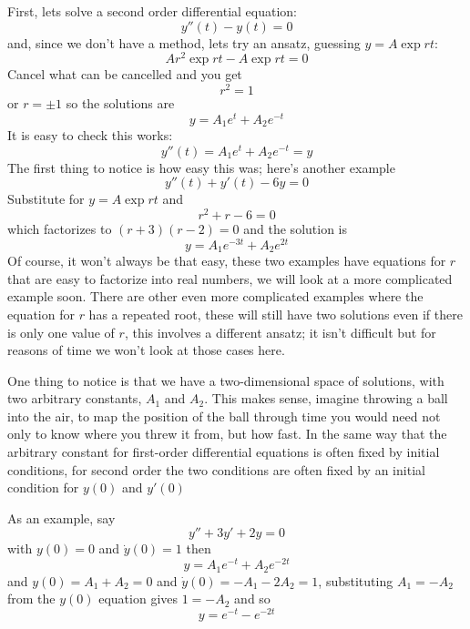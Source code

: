 \documentclass[12pt]{article}
\begin{document}
First, lets solve a second order differential equation:
\begin{equation}
  y''(t)-y(t)=0
\end{equation}
and, since we don't have a method, lets try an ansatz, guessing $y=A\exp{rt}$:
\begin{equation}
  Ar^2\exp{rt}-A\exp{rt}=0
\end{equation}
Cancel what can be cancelled and you get
\begin{equation}
  r^2=1
\end{equation}
or $r=\pm 1$ so the solutions are
\begin{equation}
  y=A_1e^t+A_2e^{-t}
\end{equation}
It is easy to check this works:
\begin{equation}
  y''(t)=A_1e^{t}+A_2e^{-t}=y
\end{equation}
The first thing to notice is how easy this was; here's another example
\begin{equation}
  y''(t)+y'(t)-6y=0
\end{equation}
Substitute for $y=A\exp{rt}$ and
\begin{equation}
  r^2+r-6=0
\end{equation}
which factorizes to $(r+3)(r-2)=0$ and the solution is
\begin{equation}
  y=A_1e^{-3t}+A_2e^{2t}
\end{equation}
Of course, it won't always be that easy, these two examples have
equations for $r$ that are easy to factorize into real numbers, we
will look at a more complicated example soon. There are other even
more complicated examples where the equation for $r$ has a repeated
root, these will still have two solutions even if there is only one
value of $r$, this involves a different ansatz; it isn't difficult but
for reasons of time we won't look at those cases here.

One thing to notice is that we have a two-dimensional space of solutions, with two
arbitrary constants, $A_1$ and $A_2$. This makes sense, imagine
throwing a ball into the air, to map the position of the ball through
time you would need not only to know where you threw it from, but how
fast. In the same way that the arbitrary constant for first-order
differential equations is often fixed by initial conditions, for
second order the two conditions are often fixed by an initial condition
for $y(0)$ and $y'(0)$

As an example, say
\begin{equation}
  y''+3y'+2y=0
\end{equation}
with $y(0)=0$ and $\dot{y}(0)=1$ then
\begin{equation}
  y=A_1e^{-t}+A_2e^{-2t}
\end{equation}
and $y(0)=A_1+A_2=0$ and $\dot{y}(0)=-A_1-2A_2=1$, substituting
$A_1=-A_2$ from the $y(0)$ equation gives $1=-A_2$ and so
\begin{equation}
  y=e^{-t}-e^{-2t}
\end{equation}
\end{document}
